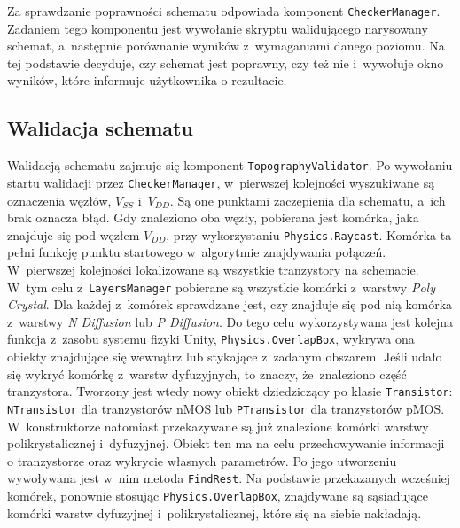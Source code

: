 \newpage %

Za sprawdzanie poprawności schematu odpowiada komponent \texttt{CheckerManager}.
Zadaniem tego komponentu jest wywołanie skryptu walidującego narysowany schemat,
a~następnie porównanie wyników z~wymaganiami danego poziomu.
Na tej podstawie decyduje, czy schemat jest poprawny, czy też nie
i~wywołuje okno wyników, które informuje użytkownika o rezultacie.

\subsection{Walidacja schematu}
\label{subsec:walidacja_schematu}

Walidacją schematu zajmuje się komponent \texttt{TopographyValidator}.
Po wywołaniu startu walidacji przez \texttt{CheckerManager},
w~pierwszej kolejności wyszukiwane są oznaczenia węzłów, $V_{SS}$ i~$V_{DD}$.
Są one punktami zaczepienia dla schematu, a~ich brak oznacza błąd.
Gdy znaleziono oba węzły, pobierana jest komórka, jaka znajduje się pod węzłem $V_{DD}$,
przy wykorzystaniu \texttt{Physics.Raycast}.
Komórka ta pełni funkcję punktu startowego w~algorytmie znajdywania połączeń.\\
\indent W~pierwszej kolejności lokalizowane są wszystkie tranzystory na schemacie.
W~tym celu z~\texttt{LayersManager} pobierane są wszystkie komórki z~warstwy \textit{Poly Crystal}.
Dla każdej z~komórek sprawdzane jest, 
czy znajduje się pod nią komórka z~warstwy \textit{N Diffusion} lub \textit{P Diffusion}.
Do tego celu wykorzystywana jest kolejna funkcja z~zasobu systemu fizyki Unity, \texttt{Physics.OverlapBox},
wykrywa ona obiekty znajdujące się wewnątrz lub stykające z~zadanym obszarem.
Jeśli udało się wykryć komórkę z~warstw dyfuzyjnych, to znaczy, że~znaleziono część tranzystora.
Tworzony jest wtedy nowy obiekt dziedziczący po klasie \texttt{Transistor}:
\texttt{NTransistor} dla tranzystorów nMOS lub \texttt{PTransistor} dla tranzystorów pMOS.
W~konstruktorze natomiast przekazywane są już znalezione komórki warstwy polikrystalicznej i~dyfuzyjnej.
Obiekt ten ma na celu przechowywanie informacji o tranzystorze oraz wykrycie własnych parametrów.
Po jego utworzeniu wywoływana jest w~nim metoda \texttt{FindRest}.
Na podstawie przekazanych wcześniej komórek, ponownie stosując \texttt{Physics.OverlapBox},
znajdywane są sąsiadujące komórki warstw dyfuzyjnej i~polikrystalicznej, które się na siebie nakładają.
